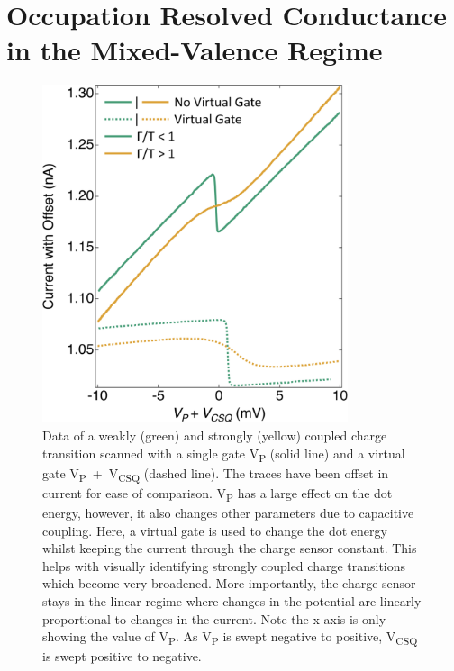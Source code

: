 \chapter{Occupation Resolved Conductance in the Mixed-Valence Regime}\label{cha:mixed_valence_conductance}


\begin{figure}[ht]
  \begin{center}
    \includegraphics[width=0.8\textwidth]{figures/ch3/crop_PosterFiguresMaster.009.png}
    \caption[Measuring charge transitions with and without a virtual gate]{\label{fig:ch3/virtual_gate_example} 
    Data of a weakly (green) and strongly (yellow) coupled charge transition scanned with a single gate V\textsubscript{P} (solid line) and a virtual gate  V\textsubscript{P}~+~V\textsubscript{CSQ} (dashed line). The traces have been offset in current for ease of comparison. V\textsubscript{P} has a large effect on the dot energy, however, it also changes other parameters due to capacitive coupling. Here, a virtual gate is used to change the dot energy whilst keeping the current through the charge sensor constant. This helps with visually identifying strongly coupled charge transitions which become very broadened. More importantly, the charge sensor stays in the linear regime where changes in the potential are linearly proportional to changes in the current. Note the x-axis is only showing the value of V\textsubscript{P}. As V\textsubscript{P} is swept negative to positive, V\textsubscript{CSQ} is swept positive to negative.}
  \end{center}
\end{figure}


